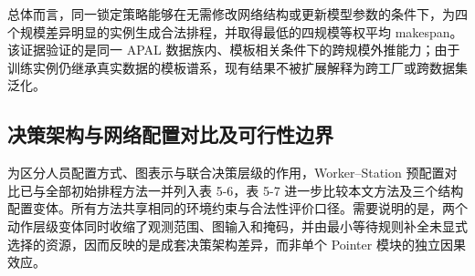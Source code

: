 \documentclass[journal,10pt]{IEEEtran}
\begin{document}
总体而言，同一锁定策略能够在无需修改网络结构或更新模型参数的条件下，为四个规模差异明显的实例生成合法排程，并取得最低的四规模等权平均 makespan。该证据验证的是同一 APAL 数据族内、模板相关条件下的跨规模外推能力；由于训练实例仍继承真实数据的模板谱系，现有结果不被扩展解释为跨工厂或跨数据集泛化。

\subsection{决策架构与网络配置对比及可行性边界}\label{ux51b3ux7b56ux67b6ux6784ux4e0eux7f51ux7edcux914dux7f6eux5bf9ux6bd4ux53caux53efux884cux6027ux8fb9ux754c}

为区分人员配置方式、图表示与联合决策层级的作用，Worker--Station 预配置对比已与全部初始排程方法一并列入表 5-6，表 5-7 进一步比较本文方法及三个结构配置变体。所有方法共享相同的环境约束与合法性评价口径。需要说明的是，两个动作层级变体同时收缩了观测范围、图输入和掩码，并由最小等待规则补全未显式选择的资源，因而反映的是成套决策架构差异，而非单个 Pointer 模块的独立因果效应。
\end{document}
